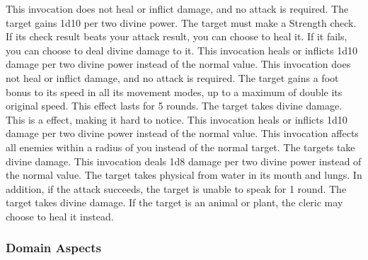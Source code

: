             This invocation does not heal or inflict damage, and no attack is required.
            The target gains 1d10  per two divine power.
            The target must make a Strength check.
            If its check result beats your attack result, you can choose to heal it.
            If it fails, you can choose to deal divine damage to it.
            This invocation heals or inflicts 1d10 damage per two divine power instead of the normal value.
            This invocation does not heal or inflict damage, and no attack is required.
            The target gains a  foot bonus to its speed in all its movement modes, up to a maximum of double its original speed.
            This effect lasts for 5 rounds.
            The target takes divine damage.
            This is a  effect, making it hard to notice.
            This invocation heals or inflicts 1d10 damage per two divine power instead of the normal value.
            This invocation affects all enemies within a \areasmall radius of you instead of the normal target.
            The targets take divine damage.
            This invocation deals 1d8 damage per two divine power instead of the normal value.
            The target takes physical  from water in its mouth and lungs.
            In addition, if the attack succeeds, the target is unable to speak for 1 round.
            The target takes divine damage.
            If the target is an animal or plant, the cleric may choose to heal it instead.

        \subsubsection{Domain Aspects}\label{Domain Aspects}

